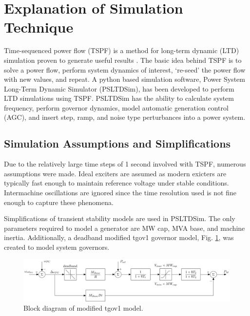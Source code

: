 \section{Explanation of Simulation Technique}
Time-sequenced power flow (TSPF) is a method for long-term dynamic (LTD) simulation proven to generate useful results \cite{DonnellyVoltageControl}.
The basic idea behind TSPF is to solve a power flow, perform system dynamics of interest, `re-seed' the power flow with new values, and repeat.
A python based simulation software, Power System Long-Term Dynamic Simulator (PSLTDSim), has been developed to perform LTD simulations using TSPF.
PSLTDSim has the ability to calculate system frequency, perform governor dynamics, model automatic generation control (AGC), and insert step, ramp, and noise type perturbances into a power system.

\subsection{Simulation Assumptions and Simplifications}
Due to the relatively large time steps of 1 second involved with TSPF, numerous assumptions were made.
Ideal exciters are assumed as modern exicters are typically fast enough to maintain reference voltage under stable conditions.
Intermachine oscillations are ignored since the time resolution used is not fine enough to capture these phenomena.

Simplifications of transient stability models are used in PSLTDSim.
The only parameters required to model a generator are MW cap, MVA base, and machine inertia.
Additionally, a deadband modified tgov1 governor model, Fig. \ref{fig: tgov1BlockDiagram},  was created to model system governors.

\begin{figure}[!ht]
	\centering
	\includegraphics[width=\linewidth]{figures/tgov1DB}
	\caption{Block diagram of modified tgov1 model.}
	\label{fig: tgov1BlockDiagram}
\end{figure}

